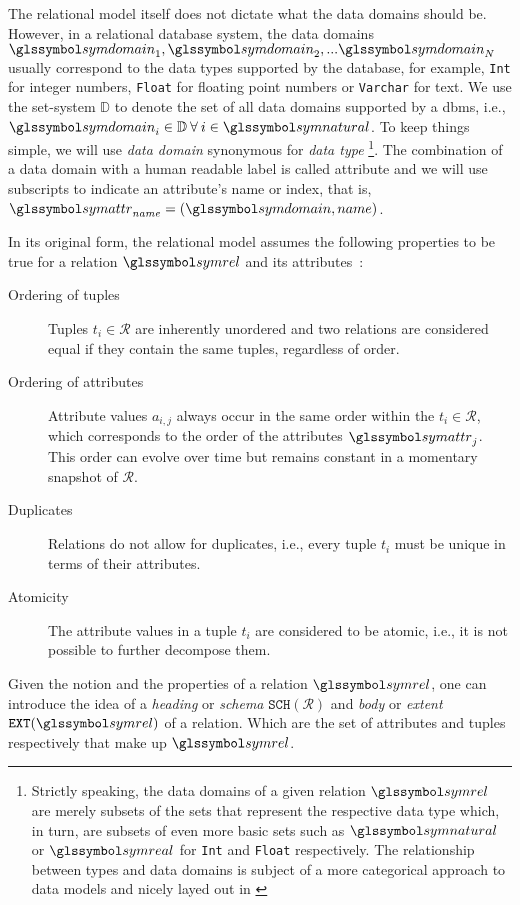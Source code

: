 The relational model itself does not dictate what the data domains should be. However, in a relational database system, the data domains $\symdomain_1, \symdomain_2, ... \symdomain_N$ usually correspond to the data types supported by the database, for example, \lstinline{Int} for integer numbers, \lstinline{Float} for floating point numbers or \lstinline{Varchar} for text. We use the set-system $\mathbb{D}$ to denote the set of all data domains supported by a \gls{dbms}, i.e., $\symdomain_i \in \mathbb{D} \: \forall \:  i \in \symnatural$. To keep things simple, we will use \emph{data domain} synonymous for \emph{data type} \footnote{Strictly speaking, the data domains of a given relation $\symrel$ are merely subsets of the sets that represent the respective data type which, in turn, are subsets of even more basic sets such as $\symnatural$ or $\symreal$ for \lstinline{Int} and \lstinline{Float} respectively. The relationship between types and data domains is subject of a more categorical approach to data models and nicely layed out in \cite{Spivak:2009Simplicial}}. The combination of a data domain with a human readable label is called attribute and we will use subscripts to indicate an attribute's name or index, that is, $\symattr_{name} = (\symdomain, name)$. 

In its original form, the relational model assumes the following properties to be true for a relation $\symrel$ and its attributes~\cite{Codd:1970Relational}:

\begin{description}
    \item[Ordering of tuples] Tuples $t_i \in \mathcal{R}$ are inherently unordered and two relations are considered equal if they contain the same tuples, regardless of order.
    \item[Ordering of attributes] Attribute values $a_{i,j}$ always occur in the same order within the $t_i \in \mathcal{R}$, which corresponds to the order of the attributes $\symattr_j$. This order can evolve over time but remains constant in a momentary snapshot of $\mathcal{R}$.
    \item[Duplicates] Relations do not allow for duplicates, i.e., every tuple $t_i$ must be unique in terms of their attributes.
    \item[Atomicity] The attribute values in a tuple $t_i$ are considered to be atomic, i.e., it is not possible to further decompose them.
\end{description}

Given the notion and the properties of a relation $\symrel$, one can introduce the idea of a \emph{heading} or \emph{schema} $\mathtt{SCH}(\mathcal{R})$ and \emph{body} or \emph{extent} $\mathtt{EXT}(\symrel)$ of a relation. Which are the set of attributes and tuples respectively that make up $\symrel$.

